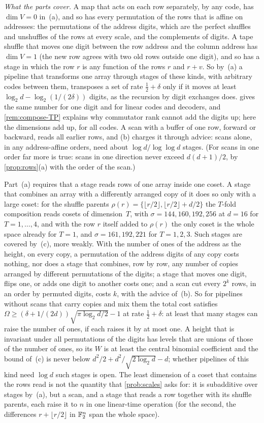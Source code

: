 \emph{What the parts cover.} A map that acts on each row separately, by any code, has $\dim V=0$ in~(a), and so has
every permutation of the rows that is affine on addresses: the permutations of the address digits, which are the
perfect shuffles and unshuffles of the rows at every scale, and the complements of digits. A tape shuffle that moves
one digit between the row address and the column address has $\dim V=1$ (the new row agrees with two old rows outside
one digit), and so has a stage in which the row $r$ is any function of the rows $r$ and $r+v$. So by~(a) a pipeline
that transforms one array through stages of these kinds, with arbitrary codes between them, transposes a set of rate
$\tfrac12+\delta$ only if it moves at least $\log_2d-\log_2(1/(2\delta))$ digits, as the recursion by digit exchanges
does.  gives the same number for one digit and for linear codes and decoders, and
\cref{rem:compose-TP} explains why commutator rank cannot add the digits up; here the dimensions add up, for all
codes. A scan with a buffer of one row, forward or backward, reads all earlier rows, and (b) charges it through
advice: scans alone, in any address-affine orders, need about $\log d/\log\log d$ stages. (For scans in one order far
more is true: scans in one direction never exceed $d(d+1)/2$, by \cref{prop:rows}(a) with the order of the scan.)

Part~(a) requires that a stage reads rows of one array inside one coset. A stage that combines an array with a
differently arranged copy of it does so only with a large coset: for the shuffle parents
$\rho(r)=\{\lfloor r/2\rfloor,\lfloor r/2\rfloor+d/2\}$ the $T$-fold composition reads cosets of dimension~$T$, with
$\sigma=144,160,192,256$ at $d=16$ for $T=1,\dots,4$, and with the row $r$ itself added to $\rho(r)$ the only coset
is the whole space already for $T=1$, and $\sigma=161,192,221$ for $T=1,2,3$. Such stages are covered by~(c),
more weakly. With the number of ones of the address as the height, on every copy, a permutation of the address
digits of any copy costs nothing, nor does a stage that combines, row by row, any number of copies arranged by
different permutations of the digits; a stage that moves one digit, flips one, or adds one digit to another costs
one; and a scan cut every $2^k$ rows, in an order by permuted digits, costs $k$, with the advice of~(b). So for
pipelines without scans that carry copies and mix them the total cost satisfies
$\Omega\ge(\delta+1/(2d))\sqrt{\pi\log_2d/2}-1$ at rate $\tfrac12+\delta$: at least that many stages can raise
the number of ones, if each raises it by at most one. A height that is invariant under all permutations of the
digits has levels that are unions of those of the number of ones, so its $W$ is at least the central binomial
coefficient and the bound of~(c) is never below $d^2/2+d^2/\sqrt{2\log_2d}-d$; whether pipelines of this kind need
$\log d$ such stages is open. The least
dimension of a coset that contains the rows read is not the quantity that \cref{prob:scales} asks for: it is
subadditive over stages by~(a), but a scan, and a stage that reads a row together with its shuffle parents, each
raise it to $n$ in one linear-time operation (for the second, the differences $r+\lfloor r/2\rfloor$ in $\mathbb{F}_2^n$
span the whole space).

